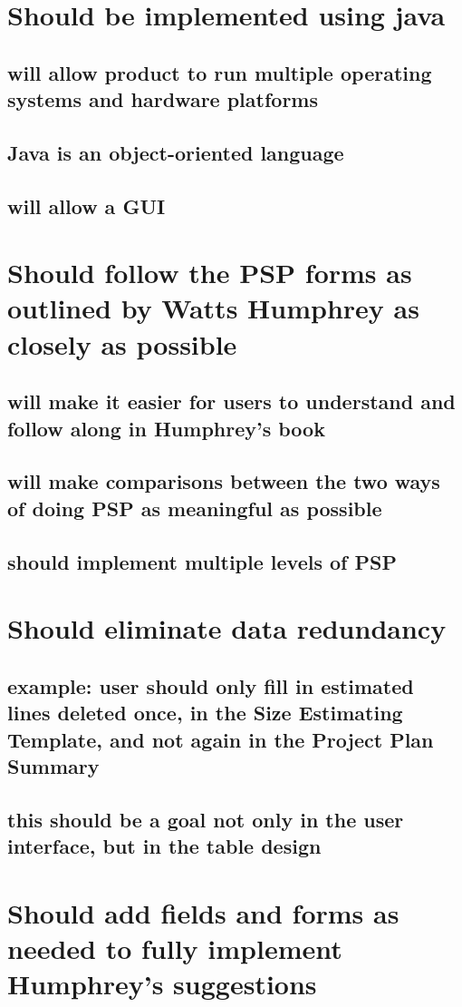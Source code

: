 \section{Should be implemented using java}
\subsection{will allow product to run multiple operating systems and
hardware platforms}
\subsection{Java is an object-oriented language}
\subsection{will allow a GUI}
\section{Should follow the PSP forms as outlined by Watts Humphrey as
closely as possible}
\subsection{will make it easier for users to understand and follow along in
Humphrey's book}
\subsection{will make comparisons between the two ways of doing PSP as
meaningful as possible}
\subsection{should implement multiple levels of PSP}
\section{Should eliminate data redundancy}
\subsection{example: user should only fill in estimated lines deleted once,
in the Size Estimating Template, and not again in the Project Plan Summary}
\subsection{this should be a goal not only in the user interface, but in
the table design}
\section{Should add fields and forms as needed to fully implement
Humphrey's suggestions}
